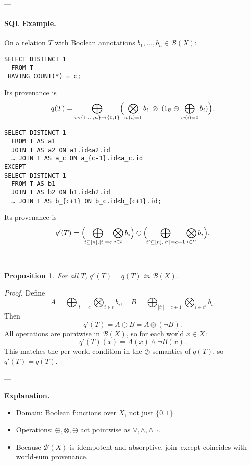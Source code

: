 \documentclass{article}
\newtheorem{proposition}{Proposition}
\begin{document}
---

\paragraph{SQL Example.}  
On a relation \(T\) with Boolean annotations \(b_1,\dots,b_n\in\mathcal{B}(X)\):

\begin{verbatim}
SELECT DISTINCT 1
  FROM T
 HAVING COUNT(*) = c;
\end{verbatim}

Its provenance is
\[
q(T)=\bigoplus_{w:\{1,\dots,n\}\to\{0,1\}}
\Bigl(
\bigotimes_{w(i)=1}b_i
\;\otimes\;
(1_{\mathcal{B}}\ominus\bigoplus_{w(i)=0}b_i)
\Bigr).
\]

\begin{verbatim}
SELECT DISTINCT 1
  FROM T AS a1
  JOIN T AS a2 ON a1.id<a2.id
  … JOIN T AS a_c ON a_{c-1}.id<a_c.id
EXCEPT
SELECT DISTINCT 1
  FROM T AS b1
  JOIN T AS b2 ON b1.id<b2.id
  … JOIN T AS b_{c+1} ON b_c.id<b_{c+1}.id;
\end{verbatim}

Its provenance is
\[
q'(T)=\Bigl(\!\bigoplus_{t\subseteq[n],|t|=c}\bigotimes_{i\in t}b_i\Bigr)
\ominus
\Bigl(\!\bigoplus_{t'\subseteq[n],|t'|=c+1}\bigotimes_{i\in t'}b_i\Bigr).
\]

---

\begin{proposition}
For all \(T\), \(q'(T)=q(T)\) in \(\mathcal{B}(X)\).
\end{proposition}

\begin{proof}
Define
\[
A=\bigoplus_{|t|=c}\bigotimes_{i\in t}b_i, \quad
B=\bigoplus_{|t'|=c+1}\bigotimes_{i\in t'}b_i.
\]
Then
\[
q'(T)=A\ominus B=A\otimes(\neg B).
\]
All operations are pointwise in \(\mathcal{B}(X)\), so for each world \(x\in X\):
\[
q'(T)(x)=A(x)\wedge\neg B(x).
\]
This matches the per‐world condition in the $\oslash$‐semantics of $q(T)$, so $q'(T)=q(T)$.
\end{proof}

---

\noindent\textbf{Explanation.}
\begin{itemize}
  \item Domain: Boolean functions over $X$, not just $\{0,1\}$.  
  \item Operations: $\oplus,\otimes,\ominus$ act pointwise as $\vee,\wedge,\wedge\neg$.  
  \item Because $\mathcal{B}(X)$ is idempotent and absorptive, join–except coincides with world‐sum provenance.
\end{itemize}
\end{document}
